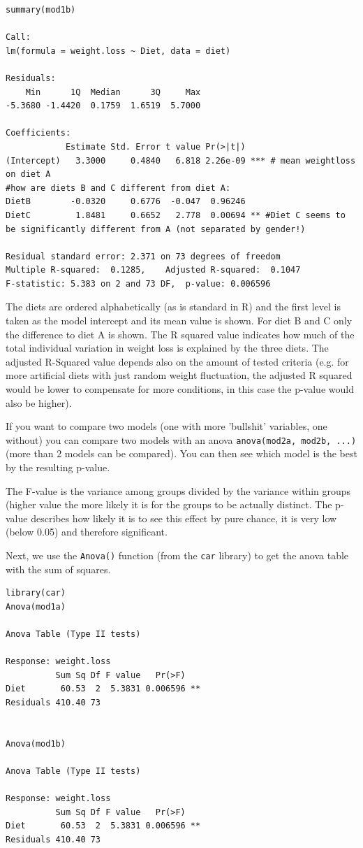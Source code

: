 \documentclass{article}
\begin{document}
\begin{lstlisting}
summary(mod1b)

Call:
lm(formula = weight.loss ~ Diet, data = diet)

Residuals:
    Min      1Q  Median      3Q     Max 
-5.3680 -1.4420  0.1759  1.6519  5.7000 

Coefficients:
            Estimate Std. Error t value Pr(>|t|)    
(Intercept)   3.3000     0.4840   6.818 2.26e-09 *** # mean weightloss on diet A
#how are diets B and C different from diet A:
DietB        -0.0320     0.6776  -0.047  0.96246    
DietC         1.8481     0.6652   2.778  0.00694 ** #Diet C seems to be significantly different from A (not separated by gender!)

Residual standard error: 2.371 on 73 degrees of freedom
Multiple R-squared:  0.1285,	Adjusted R-squared:  0.1047 
F-statistic: 5.383 on 2 and 73 DF,  p-value: 0.006596
\end{lstlisting}
The diets are ordered alphabetically (as is standard in R) and the first level is taken as the model intercept and its mean value is shown. For diet B and C only the difference to diet A is shown. The R squared value indicates how much of the total individual variation in weight loss is explained by the three diets. The adjusted R-Squared value depends also on the amount of tested criteria (e.g. for more artificial diets with just random weight fluctuation, the adjusted R squared would be lower to compensate for more conditions, in this case the p-value would also be higher).\par 
If you want to compare two models (one with more 'bullshit' variables, one without) you can compare two models with an anova \texttt{anova(mod2a, mod2b, ...)} (more than 2 models can be compared). You can then see which model is the best by the resulting p-value.\par
The F-value is the variance among groups divided by the variance within groups (higher value the more likely it is for the groups to be actually distinct. The p-value describes how likely it is to see this effect by pure chance, it is very low (below 0.05) and therefore significant.\par 
Next, we use the \texttt{Anova()} function (from the \texttt{car} library) to get the anova table with the sum of squares.\\
\begin{lstlisting}
library(car)
Anova(mod1a)

Anova Table (Type II tests)

Response: weight.loss
          Sum Sq Df F value   Pr(>F)   
Diet       60.53  2  5.3831 0.006596 **
Residuals 410.40 73                    


Anova(mod1b)

Anova Table (Type II tests)

Response: weight.loss
          Sum Sq Df F value   Pr(>F)   
Diet       60.53  2  5.3831 0.006596 **
Residuals 410.40 73                    
\end{lstlisting}
\end{document}
